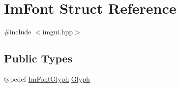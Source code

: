 \hypertarget{struct_im_font}{}\section{Im\+Font Struct Reference}
\label{struct_im_font}


{\ttfamily \#include $<$imgui.\+hpp$>$}

\subsection*{Public Types}
\begin{DoxyCompactItemize}
\item 
typedef \hyperlink{struct_im_font_glyph}{Im\+Font\+Glyph} \hyperlink{struct_im_font_a4b802233ac8d3f3beddc395837288683}{Glyph}
\end{DoxyCompactItemize}
